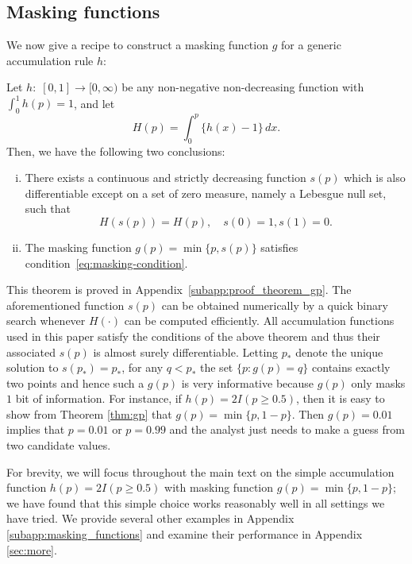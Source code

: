 \documentclass{biometrika}
\newcommand{\pth}{p_{*}}
\newcommand{\1}{\mathbf{1}}
\newcommand{\s}{s}
\begin{document}
\subsection{Masking functions}\label{subsec:masking}

We now give a recipe to construct a masking function $g$ for a generic accumulation rule $h$:

\begin{theorem}\label{thm:gp}
  Let $h:\;[0,1]\to [0,\infty)$ be any non-negative non-decreasing function with $\int_{0}^{1} h(p) = 1$, and let
\[H(p) = \int_{0}^{p}\{h(x) - 1\}\, dx.\]
Then, we have the following two conclusions: 
\begin{enumerate}[(i)]
\item There exists a continuous and strictly decreasing function $s(p)$ which is also differentiable except on a set of zero measure, namely a Lebesgue null set, such that 
\begin{equation}\label{eq:integral_equation}
H(s(p)) = H(p), \quad s(0) = 1, s(1) = 0.
\end{equation}
\item The masking function
$g(p) = \min\{p, \s(p)\}$
satisfies condition~\eqref{eq:masking-condition}.
\end{enumerate}
\end{theorem}
This theorem is proved in Appendix~\ref{subapp:proof_theorem_gp}. The aforementioned function $\s(p)$ can be obtained numerically by a quick binary search whenever $H(\cdot)$ can be computed efficiently. All accumulation functions used in this paper satisfy the conditions of the above theorem and thus their associated $s(p)$ is almost surely differentiable. Letting $\pth$ denote the unique solution to $s(\pth)=\pth$, for any $q<\pth$ the set $\{p: g(p) = q\}$ contains exactly two points and hence such a $g(p)$ is very informative because $g(p)$ only masks $1$ bit of information. For instance, if $h(p) = 2I(p\ge 0.5)$, then it is easy to show from Theorem \ref{thm:gp} that $g(p) = \min\{p, 1 - p\}$. Then $g(p) = 0.01$ implies that $p = 0.01$ or $p = 0.99$ and the analyst just needs to make a guess from two candidate values. 

For brevity, we will focus throughout the main text on the simple accumulation function $h(p) = 2I(p\ge 0.5)$ with masking function $g(p) = \min\{p, 1-p\}$; we have found that this simple choice works reasonably well in all settings we have tried. We provide several other examples in Appendix \ref{subapp:masking_functions} and examine their performance in Appendix \ref{sec:more}.
\end{document}
